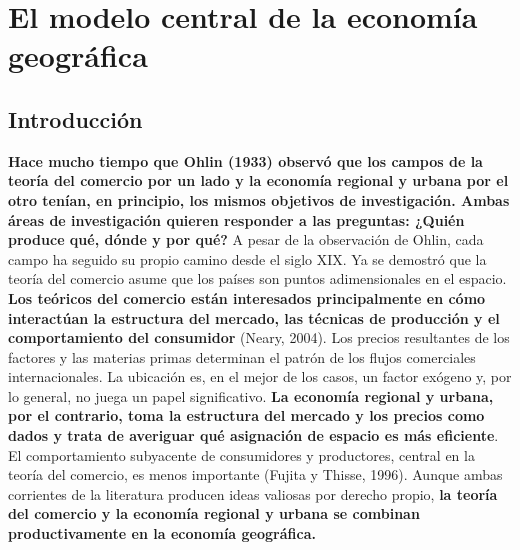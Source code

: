 \setcounter{chapter}{2}
\chapter{El modelo central de la economía geográfica}
\section{Introducción}
\textbf{Hace mucho tiempo que Ohlin (1933) observó que los campos de la teoría del comercio por un lado y la economía regional y urbana por el otro tenían, en principio, los mismos objetivos de investigación. Ambas áreas de investigación quieren responder a las preguntas: ¿Quién produce qué, dónde y por qué?} A pesar de la observación de Ohlin, cada campo ha seguido su propio camino desde el siglo XIX. Ya se demostró que la teoría del comercio asume que los países son puntos adimensionales en el espacio. \textbf{Los teóricos del comercio están interesados principalmente en cómo interactúan la estructura del mercado, las técnicas de producción y el comportamiento del consumidor} (Neary, 2004). Los precios resultantes de los factores y las materias primas determinan el patrón de los flujos comerciales internacionales. La ubicación es, en el mejor de los casos, un factor exógeno y, por lo general, no juega un papel significativo. \textbf{La economía regional y urbana, por el contrario, toma la estructura del mercado y los precios como dados y trata de averiguar qué asignación de espacio es más eficiente}. El comportamiento subyacente de consumidores y productores, central en la teoría del comercio, es menos importante (Fujita y Thisse, 1996). Aunque ambas corrientes de la literatura producen ideas valiosas por derecho propio, \textbf{la teoría del comercio y la economía regional y urbana se combinan productivamente en la economía geográfica.}\\   


